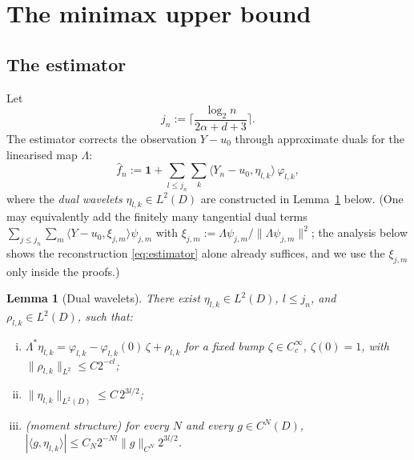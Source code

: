 \documentclass[11pt]{amsart}
\newtheorem{lemma}[theorem]{Lemma}
\newcommand{\1}{\mathbf{1}}
\begin{document}
\section{The minimax upper bound}\label{sec:upper}

\subsection{The estimator}
Let
\[
j_n:=\Big\lceil \frac{\log_2 n}{2\alpha+d+3}\Big\rceil .
\]
The estimator corrects the observation $Y-u_0$ through approximate duals for
the linearised map $\Lambda$:
\begin{equation}\label{eq:estimator}
\hat f_n:=\1+\sum_{l\le j_n}\sum_k\langle Y_n-u_0,\eta_{l,k}\rangle\,
\varphi_{l,k},
\end{equation}
where the \emph{dual wavelets} $\eta_{l,k}\in L^2(D)$ are constructed in
Lemma~\ref{lem:dual} below. (One may equivalently add the finitely many
tangential dual terms $\sum_{j\le j_n}\sum_m\langle Y-u_0,\xi_{j,m}\rangle
\psi_{j,m}$ with $\xi_{j,m}:=\Lambda\psi_{j,m}/\|\Lambda\psi_{j,m}\|^2$;
the analysis below shows the reconstruction \eqref{eq:estimator} alone
already suffices, and we use the $\xi_{j,m}$ only inside the proofs.)

\begin{lemma}[Dual wavelets]\label{lem:dual}
There exist $\eta_{l,k}\in L^2(D)$, $l\le j_n$, and $\rho_{l,k}\in L^2(D)$,
such that:
\begin{enumerate}[(i)]
\item $\Lambda^*\eta_{l,k}=\varphi_{l,k}-\varphi_{l,k}(0)\,\zeta+\rho_{l,k}$
for a fixed bump $\zeta\in C^\infty_c$, $\zeta(0)=1$, with
$\|\rho_{l,k}\|_{L^2}\le C2^{-cl}$;
\item $\|\eta_{l,k}\|_{L^2(D)}\le C\,2^{3l/2}$;
\item (moment structure) for every $N$ and every $g\in C^N(D)$,
$|\langle g,\eta_{l,k}\rangle|\le
C_N 2^{-Nl}\|g\|_{C^N}2^{3l/2}$.
\end{enumerate}
\end{lemma}
\end{document}
